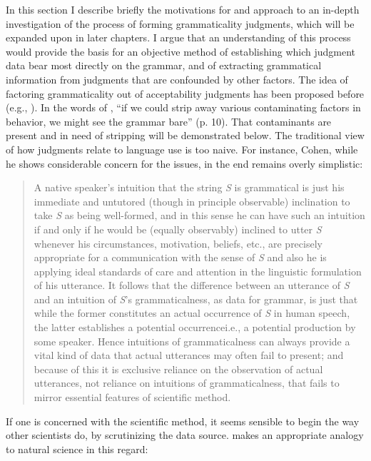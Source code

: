 In this section I describe briefly the motivations for and approach to an in-depth investigation of the process of forming grammaticality judgments, which will be expanded upon in later chapters. I argue that an understanding of this process would provide the basis for an objective method of establishing which judgment data bear most directly on the grammar, and of extracting grammatical information from judgments that are confounded by other factors. The idea of factoring grammaticality out of acceptability judgments has been proposed before (e.g., \citet{Birdsong1989,CarrollEtAl1981,Botha1973}). In the words of \citet{GleitmanEtAl1970}, ``if we could strip away various contaminating factors in behavior, we might see the grammar bare'' (p. 10). That contaminants are present and in need of stripping will be demonstrated below. The traditional view of how judgments relate to language use is too naive. For instance, Cohen, while he shows considerable concern for the issues, in the end remains overly simplistic:

\begin{quote}
A native speaker's intuition that the string \emph{S} is grammatical is just his immediate and untutored (though in principle observable) inclination to take \emph{S} as being well-formed, and in this sense he can have such an intuition if and only if he would be (equally observably) inclined to utter \emph{S} whenever his circumstances, motivation, beliefs, etc., are precisely appropriate for a communication with the sense of \emph{S} and also he is applying ideal standards of care and attention in the linguistic formulation of his utterance. It follows that the difference between an utterance of \emph{S} and an intuition of \emph{S}'s grammaticalness, as data for grammar, is just that while the former constitutes an actual occurrence of \emph{S} in human speech, the latter establishes a potential occurrence\schdash{}i.e., a potential production by some speaker. Hence intuitions of grammaticalness can always provide a vital kind of data that actual utterances may often fail to present; and because of this it is exclusive reliance on the observation of actual utterances, not reliance on intuitions of grammaticalness, that fails to mirror essential features of scientific method. \citep[240\textendash{}241]{Cohen1981}
\end{quote}

If one is concerned with the scientific method, it seems sensible to begin the way other scientists do, by scrutinizing the data source. \citet{Bever1972} makes an appropriate analogy to natural science in this regard:

